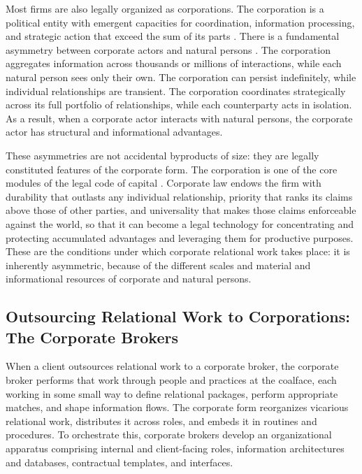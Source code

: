 \documentclass[
]{article}
\begin{document}
Most firms are also legally organized as corporations. The corporation is a political entity with emergent capacities for coordination, information processing, and strategic action that exceed the sum of its parts \autocite{ciepleyPublicPrivatePolitical2013a,farrellUndergroundEmpireHow2023}. There is a fundamental asymmetry between corporate actors and natural persons \autocite{colemanAsymmetricSociety1982,colemanFoundationsSocialTheory1990}. The corporation aggregates information across thousands or millions of interactions, while each natural person sees only their own. The corporation can persist indefinitely, while individual relationships are transient. The corporation coordinates strategically across its full portfolio of relationships, while each counterparty acts in isolation. As a result, when a corporate actor interacts with natural persons, the corporate actor has structural and informational advantages.

These asymmetries are not accidental byproducts of size: they are legally constituted features of the corporate form. The corporation is one of the core modules of the legal code of capital \autocite{pistorCodeCapitalHow2019}. Corporate law endows the firm with durability that outlasts any individual relationship, priority that ranks its claims above those of other parties, and universality that makes those claims enforceable against the world, so that it can become a legal technology for concentrating and protecting accumulated advantages and leveraging them for productive purposes. These are the conditions under which corporate relational work takes place: it is inherently asymmetric, because of the different scales and material and informational resources of corporate and natural persons.

\subsection{Outsourcing Relational Work to Corporations: The Corporate Brokers}

When a client outsources relational work to a corporate broker, the corporate broker performs that work through people and practices at the coalface, each working in some small way to define relational packages, perform appropriate matches, and shape information flows. The corporate form reorganizes vicarious relational work, distributes it across roles, and embeds it in routines and procedures. To orchestrate this, corporate brokers develop an organizational apparatus comprising internal and client-facing roles, information architectures and databases, contractual templates, and interfaces.
\end{document}
